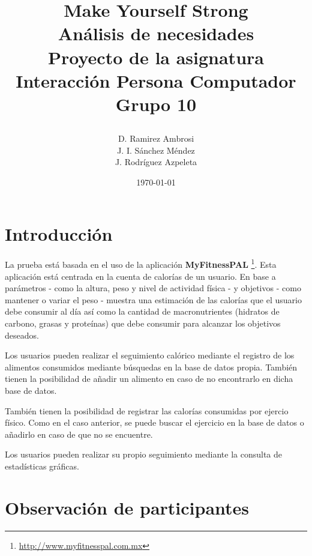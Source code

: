 \documentclass[a4paper]{article}
\date{}
\author{D. Ramirez Ambrosi \\ J. I. Sánchez Méndez \\ J. Rodríguez Azpeleta}
\title{\begin{center}
\textbf{\Huge{Make Yourself Strong}} \\ Análisis de necesidades  \\Proyecto de la asignatura Interacción Persona Computador \\ \Huge{Grupo 10}
\end{center}}
\date{\today}
\renewcommand\listfigurename{\centering LISTA DE FIGURAS}
\begin{document}
\maketitle

\thispagestyle{empty}%
\newpage
\tableofcontents%
\thispagestyle{empty}
\newpage





\setcounter{page}{1}%


\section{Introducción}

La prueba está basada en el uso de la aplicación \textbf{MyFitnessPAL} \footnote{\url{http://www.myfitnesspal.com.mx}}. Esta aplicación está centrada en la cuenta de calorías de un usuario. En base a parámetros - como la altura, peso y nivel de actividad física - y objetivos - como mantener o variar el peso - muestra una estimación de las calorías que el usuario debe consumir al día así como la cantidad de macronutrientes (hidratos de carbono, grasas y proteínas) que debe consumir para alcanzar los objetivos deseados.

Los usuarios pueden realizar el seguimiento calórico mediante el registro de los alimentos consumidos mediante búsquedas en la base de datos propia. También tienen la posibilidad de añadir un alimento en caso de no encontrarlo en dicha base de datos.

También tienen la posibilidad de registrar las calorías consumidas por ejercio físico. Como en el caso anterior, se puede buscar el ejercicio en la base de datos o añadirlo en caso de que no se encuentre.

Los usuarios pueden realizar su propio seguimiento mediante la consulta de estadísticas gráficas.

\section{Observación de participantes}
\end{document}
